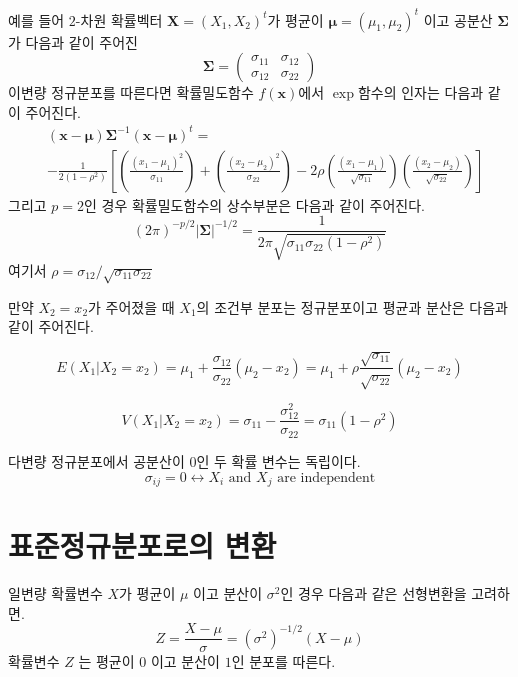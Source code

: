 \documentclass[
]{book}
\theoremstyle{definition}
\theoremstyle{definition}
\theoremstyle{definition}
\theoremstyle{remark}
\begin{document}
예를 들어 \(2\)-차원 확률벡터 \(\bm X=(X_1, X_2)^t\)가 평균이 \(\bm \mu=(\mu_1,\mu_2)^t\) 이고
공분산 \(\bm \Sigma\)가 다음과 같이 주어진
\begin{equation*}
\bm \Sigma =
  \begin{pmatrix}
\sigma_{11} & \sigma_{12} \\
\sigma_{12} & \sigma_{22}
\end{pmatrix}
\end{equation*}
이변량 정규분포를 따른다면 확률밀도함수 \(f(\bm x)\)에서 \(\exp\)함수의 인자는 다음과 같이 주어진다.
\begin{eqnarray*}
&(\bm x-\bm \mu) \bm \Sigma^{-1}(\bm x-\bm \mu)^t
= \\
&-\frac{1}{2 (1-\rho^2)} 
\left [ 
  \left ( \frac{(x_1-\mu_1)^2}{\sigma_{11}} \right )
  +\left ( \frac{(x_2-\mu_2)^2}{\sigma_{22}} \right )
  -2 \rho \left ( \frac{(x_1-\mu_1)}{\sqrt{\sigma_{11}}} \right )
  \left ( \frac{(x_2-\mu_2)}{\sqrt{\sigma_{22}}} \right )
  \right ]
\end{eqnarray*}
그리고 \(p=2\)인 경우 확률밀도함수의 상수부분은 다음과 같이 주어진다.
\[ (2 \pi)^{-p/2} | \bm \Sigma|^{-1/2} = \frac{1}{ 2 \pi \sqrt{\sigma_{11} \sigma_{22} (1-\rho^2)}} \]
여기서 \(\rho = \sigma_{12} / \sqrt{\sigma_{11} \sigma_{22}}\)

만약 \(X_2 = x_2\)가 주어졌을 때 \(X_1\)의 조건부 분포는 정규분포이고 평균과 분산은 다음과 같이 주어진다.

\[ 
  E( X_1 |  X_2 =  x_2 ) =  \mu_1 +  \frac{\sigma_{12}}{\sigma_{22}} ( \mu_2 -  x_2)  = \mu_1 +  \rho \frac{\sqrt{\sigma_{11}}}{\sqrt{\sigma_{22}}} ( \mu_2 -  x_2) \]

\[
  V( X_1 |  X_2 =  x_2 )  =  \sigma_{11} - \frac{\sigma^2_{12}}{\sigma_{22}}  = \sigma_{11}(1-\rho^2)
  \]

다변량 정규분포에서 공분산이 0인 두 확률 변수는 독립이다.
\[ \sigma_{ij} = 0 \leftrightarrow X_i \text{ and } X_j \text{ are independent} \]

\hypertarget{uxd45cuxc900uxc815uxaddcuxbd84uxd3ecuxb85cuxc758-uxbcc0uxd658}{%
\section{표준정규분포로의 변환}\label{uxd45cuxc900uxc815uxaddcuxbd84uxd3ecuxb85cuxc758-uxbcc0uxd658}}

일변량 확률변수 \(X\)가 평균이 \(\mu\) 이고 분산이 \(\sigma^2\)인 경우 다음과 같은 선형변환을 고려하면.
\[ Z = \frac{X - \mu}{\sigma} = (\sigma^2)^{-1/2} (X-\mu) \]
확률변수 \(Z\) 는 평균이 \(0\) 이고 분산이 \(1\)인 분포를 따른다.
\end{document}
